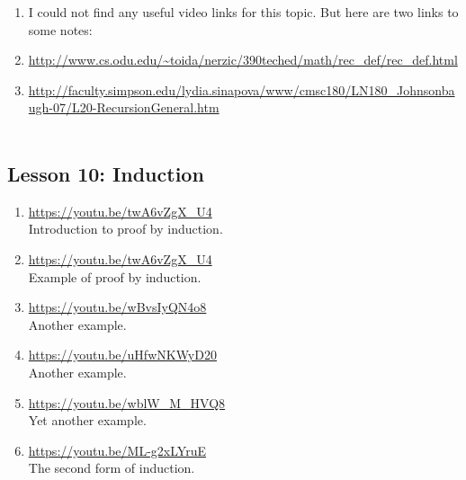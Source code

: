 \documentclass[11pt]{amsart}
\begin{document}
\begin{enumerate}

\item[] I could not find any useful video links for this topic.  But here are two links to some notes:

\item \url{http://www.cs.odu.edu/~toida/nerzic/390teched/math/rec_def/rec_def.html}\\[5pt]

\item \url{http://faculty.simpson.edu/lydia.sinapova/www/cmsc180/LN180_Johnsonbaugh-07/L20-RecursionGeneral.htm}\\[5pt]
\\[5pt]

\end{enumerate}


\subsection{Lesson 10: Induction}

\begin{enumerate}

\item \url{https://youtu.be/twA6vZgX_U4}\\
Introduction to proof by induction.\\[5pt]



\item \url{https://youtu.be/twA6vZgX_U4}\\
Example of proof by induction.\\[5pt]



\item \url{https://youtu.be/wBvsIyQN4o8}\\
Another example.\\[5pt]



\item \url{https://youtu.be/uHfwNKWyD20}\\
Another example.\\[5pt]



\item \url{https://youtu.be/wblW_M_HVQ8}\\
Yet another example.\\[5pt]



\item \url{https://youtu.be/ML-g2xLYruE}\\
The second form of induction.\\[5pt]

\end{enumerate}
\end{document}
